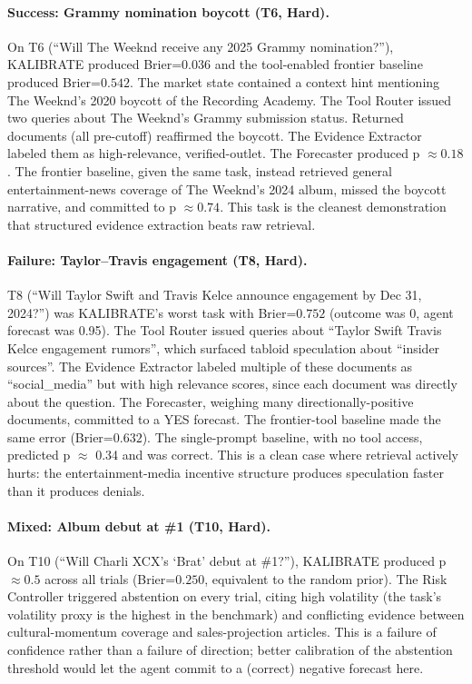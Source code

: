 \documentclass{article} %
\newcommand{\agentname}{KALIBRATE}
\begin{document}
\paragraph{Success: Grammy nomination boycott (T6, Hard).}
On T6 (``Will The Weeknd receive any 2025 Grammy nomination?''), \agentname{} produced Brier=$0.036$ and the tool-enabled frontier baseline produced Brier=$0.542$. The market state contained a context hint mentioning The Weeknd's 2020 boycott of the Recording Academy. The Tool Router issued two queries about The Weeknd's Grammy submission status. Returned documents (all pre-cutoff) reaffirmed the boycott. The Evidence Extractor labeled them as high-relevance, verified-outlet. The Forecaster produced p $\approx 0.18$. The frontier baseline, given the same task, instead retrieved general entertainment-news coverage of The Weeknd's 2024 album, missed the boycott narrative, and committed to p $\approx 0.74$. This task is the cleanest demonstration that structured evidence extraction beats raw retrieval.

\paragraph{Failure: Taylor--Travis engagement (T8, Hard).}
T8 (``Will Taylor Swift and Travis Kelce announce engagement by Dec 31, 2024?'') was \agentname{}'s worst task with Brier=$0.752$ (outcome was 0, agent forecast was 0.95). The Tool Router issued queries about ``Taylor Swift Travis Kelce engagement rumors'', which surfaced tabloid speculation about ``insider sources''. The Evidence Extractor labeled multiple of these documents as ``social\_media'' but with high relevance scores, since each document was directly about the question. The Forecaster, weighing many directionally-positive documents, committed to a YES forecast. The frontier-tool baseline made the same error (Brier=$0.632$). The single-prompt baseline, with no tool access, predicted p $\approx$ 0.34 and was correct. This is a clean case where retrieval actively hurts: the entertainment-media incentive structure produces speculation faster than it produces denials.

\paragraph{Mixed: Album debut at \#1 (T10, Hard).}
On T10 (``Will Charli XCX's `Brat' debut at \#1?''), \agentname{} produced p $\approx 0.5$ across all trials (Brier=$0.250$, equivalent to the random prior). The Risk Controller triggered abstention on every trial, citing high volatility (the task's volatility proxy is the highest in the benchmark) and conflicting evidence between cultural-momentum coverage and sales-projection articles. This is a failure of confidence rather than a failure of direction; better calibration of the abstention threshold would let the agent commit to a (correct) negative forecast here.
\end{document}
